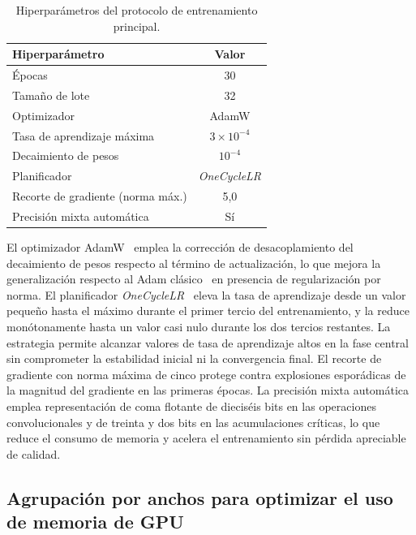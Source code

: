 \begin{table}[!htbp]
	\centering
	\caption{Hiperparámetros del protocolo de entrenamiento principal.}
	\label{tab:hiperparams-entrenamiento}
	\begin{tabular}{lc}
		\toprule
		\textbf{Hiperparámetro} & \textbf{Valor} \\
		\midrule
		Épocas                         & 30 \\
		Tamaño de lote                 & 32 \\
		Optimizador                    & AdamW \\
		Tasa de aprendizaje máxima     & $3 \times 10^{-4}$ \\
		Decaimiento de pesos           & $10^{-4}$ \\
		Planificador                   & \textit{OneCycleLR} \\
		Recorte de gradiente (norma máx.) & 5,0 \\
		Precisión mixta automática     & Sí \\
		\bottomrule
	\end{tabular}
\end{table}

El optimizador AdamW~\cite{loshchilov2019adamw} emplea la corrección de desacoplamiento del decaimiento de pesos respecto al término de actualización, lo que mejora la generalización respecto al Adam clásico~\cite{kingma2014adam} en presencia de regularización por norma. El planificador \textit{OneCycleLR}~\cite{smith2018onecycle} eleva la tasa de aprendizaje desde un valor pequeño hasta el máximo durante el primer tercio del entrenamiento, y la reduce monótonamente hasta un valor casi nulo durante los dos tercios restantes. La estrategia permite alcanzar valores de tasa de aprendizaje altos en la fase central sin comprometer la estabilidad inicial ni la convergencia final. El recorte de gradiente con norma máxima de cinco protege contra explosiones esporádicas de la magnitud del gradiente en las primeras épocas. La precisión mixta automática emplea representación de coma flotante de dieciséis bits en las operaciones convolucionales y de treinta y dos bits en las acumulaciones críticas, lo que reduce el consumo de memoria y acelera el entrenamiento sin pérdida apreciable de calidad.

\subsection{Agrupación por anchos para optimizar el uso de memoria de GPU}
\label{subsec:bucketing}

